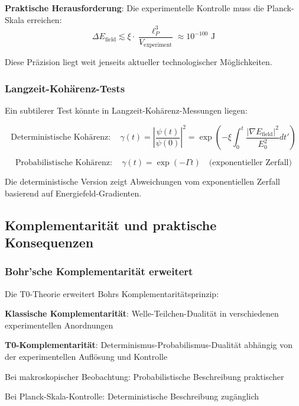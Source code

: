 \documentclass[12pt,a4paper]{article}
\newcommand{\xipar}{\xi}
\theoremstyle{definition}
\theoremstyle{remark}
\begin{document}
\textbf{Praktische Herausforderung}: Die experimentelle Kontrolle muss die Planck-Skala erreichen:
\begin{equation}
	\Delta E_{\text{field}} \lesssim \xipar \cdot \frac{\ell_P^3}{V_{\text{experiment}}} \approx 10^{-100} \text{ J}
\end{equation}

Diese Präzision liegt weit jenseits aktueller technologischer Möglichkeiten.

\subsubsection{Langzeit-Kohärenz-Tests}

Ein subtilerer Test könnte in Langzeit-Kohärenz-Messungen liegen:

\begin{equation}
	\text{Deterministische Kohärenz}: \quad \gamma(t) = \left|\frac{\psi(t)}{\psi(0)}\right|^2 = \exp\left(-\xipar \int_0^t \frac{|\nabla E_{\text{field}}|^2}{E_0^2} dt'\right)
	\label{eq:deterministic_coherence}
\end{equation}

\begin{equation}
	\text{Probabilistische Kohärenz}: \quad \gamma(t) = \exp(-\Gamma t) \quad \text{(exponentieller Zerfall)}
	\label{eq:probabilistic_coherence}
\end{equation}

Die deterministische Version zeigt Abweichungen vom exponentiellen Zerfall basierend auf Energiefeld-Gradienten.

\subsection{Komplementarität und praktische Konsequenzen}

\subsubsection{Bohr'sche Komplementarität erweitert}

Die T0-Theorie erweitert Bohrs Komplementaritätsprinzip:

\begin{tcolorbox}[colback=blue!5!white,colframe=blue!75!black,title=Erweiterte Komplementarität]
	\textbf{Klassische Komplementarität}: Welle-Teilchen-Dualität in verschiedenen experimentellen Anordnungen
	
	\textbf{T0-Komplementarität}: Determinismus-Probabilismus-Dualität abhängig von der experimentellen Auflösung und Kontrolle
	
	Bei makroskopischer Beobachtung: Probabilistische Beschreibung praktischer
	
	Bei Planck-Skala-Kontrolle: Deterministische Beschreibung zugänglich
\end{tcolorbox}
\end{document}
